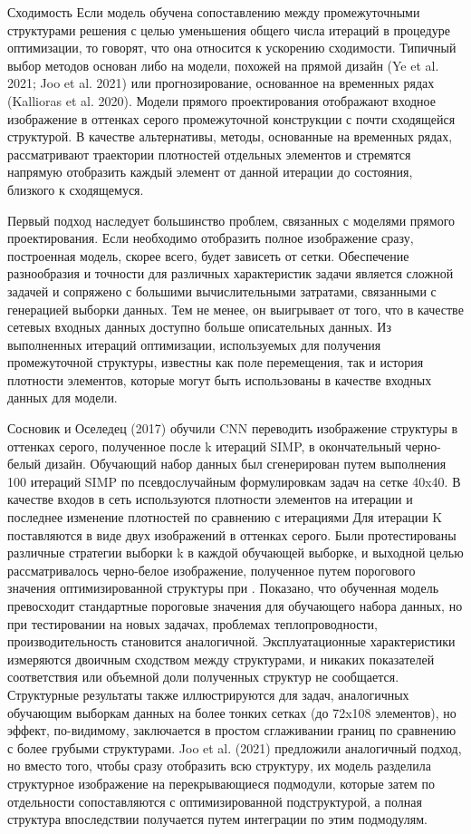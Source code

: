 Сходимость Если модель обучена сопоставлению между промежуточными структурами решения с целью уменьшения общего числа итераций в процедуре оптимизации, то говорят, что она относится к ускорению сходимости. Типичный выбор методов основан либо на модели, похожей на прямой дизайн (Ye et al. 2021; Joo et al. 2021) или прогнозирование, основанное на временных рядах (Kallioras et al. 2020). Модели прямого проектирования отображают входное изображение в оттенках серого промежуточной конструкции с почти сходящейся структурой. В качестве альтернативы, методы, основанные на временных рядах, рассматривают траектории плотностей отдельных элементов и стремятся напрямую отобразить каждый элемент от данной итерации до состояния, близкого к сходящемуся.

Первый подход наследует большинство проблем, связанных с моделями прямого проектирования. Если необходимо отобразить полное изображение сразу, построенная модель, скорее всего, будет зависеть от сетки. Обеспечение разнообразия и точности для различных характеристик задачи является сложной задачей и сопряжено с большими вычислительными затратами, связанными с генерацией выборки данных. Тем не менее, он выигрывает от того, что в качестве сетевых входных данных доступно больше описательных данных. Из выполненных итераций оптимизации, используемых для получения промежуточной структуры, известны как поле перемещения, так и история плотности элементов, которые могут быть использованы в качестве входных данных для модели.

Сосновик и Оселедец (2017) обучили CNN переводить изображение структуры в оттенках серого, полученное после k итераций SIMP, в окончательный черно-белый дизайн. Обучающий набор данных был сгенерирован путем выполнения 100 итераций SIMP по псевдослучайным формулировкам задач на сетке 40x40. В качестве входов в сеть используются плотности элементов на итерации 
и последнее изменение плотностей по сравнению с итерациями 
Для итерации K поставляются в виде двух изображений в оттенках серого. Были протестированы различные стратегии выборки k в каждой обучающей выборке, и выходной целью рассматривалось черно-белое изображение, полученное путем порогового значения оптимизированной структуры при 
. Показано, что обученная модель превосходит стандартные пороговые значения для обучающего набора данных, но при тестировании на новых задачах, проблемах теплопроводности, производительность становится аналогичной. Эксплуатационные характеристики измеряются двоичным сходством между структурами, и никаких показателей соответствия или объемной доли полученных структур не сообщается. Структурные результаты также иллюстрируются для задач, аналогичных обучающим выборкам данных на более тонких сетках (до 72x108 элементов), но эффект, по-видимому, заключается в простом сглаживании границ по сравнению с более грубыми структурами. Joo et al. (2021) предложили аналогичный подход, но вместо того, чтобы сразу отобразить всю структуру, их модель разделила структурное изображение на перекрывающиеся подмодули, которые затем по отдельности сопоставляются с оптимизированной подструктурой, а полная структура впоследствии получается путем интеграции по этим подмодулям.

